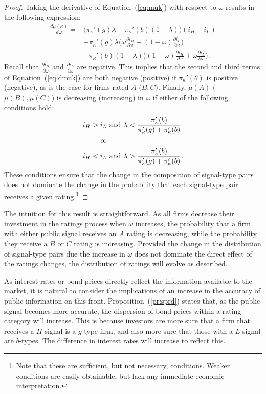 \documentclass[notitlepage]{article}
\begin{document}
\begin{proof}
Taking the derivative of Equation~(\ref{eq:muk}) with respect to $\omega$ results in the following expression:
\begin{align}
\label{eq:dmuk}
\frac{d\mu(\kappa)}{d\omega}=&\bigg(\pi_{\kappa}'(g)\lambda-\pi_{\kappa}'(b)(1-\lambda)\bigg)(i_{H}-i_{L})\nonumber\\
&+\pi_{\kappa}'(g)\lambda\bigg(\omega\frac{\partial i_{H}}{\partial \omega}+(1-\omega)\frac{\partial i_{L}}{\partial \omega}\bigg)\nonumber\\
&+\pi_{\kappa}'(b)(1-\lambda)\bigg((1-\omega)\frac{\partial i_{H}}{\partial \omega}+\omega\frac{\partial i_{L}}{\partial \omega}\bigg).
\end{align}
Recall that $\frac{\partial i_{H}}{\partial \omega}$ and $\frac{\partial i_{L}}{\partial \omega}$ are negative. This implies that the second and third terms of Equation~(\ref{eq:dmuk}) are both negative (positive) if $\pi_{\kappa}'(\theta)$ is positive (negative), as is the case for firms rated $A$ ($B,C$). Finally, $\mu(A)$ ($\mu(B),\mu(C)$) is decreasing (increasing) in $\omega$ if either of the following conditions hold:
\begin{align*}
i_{H}>i_{L} & \textup{ and }\lambda<\frac{\pi_{\kappa}'(b)}{\pi_{\kappa}'(g)+\pi_{\kappa}'(b)}\\
\textup{or} & \\
i_{H}<i_{L} & \textup{ and }\lambda>\frac{\pi_{\kappa}'(b)}{\pi_{\kappa}'(g)+\pi_{\kappa}'(b)}.
\end{align*}
These conditions ensure that the change in the composition of signal-type pairs does not dominate the change in the probability that each signal-type pair receives a given rating.\footnote{Note that these are sufficient, but not necessary, conditions. Weaker conditions are easily obtainable, but lack any immediate economic interpretation.}
\end{proof}

The intuition for this result is straightforward. As all firms decrease their investment in the ratings process when $\omega$ increases, the probability that a firm with either public signal receives an $A$ rating is decreasing, while the probability they receive a $B$ or $C$ rating is increasing. Provided the change in the distribution of signal-type pairs due the increase in $\omega$ does not dominate the direct effect of the ratings changes, the distribution of ratings will evolve as described. 

As interest rates or bond prices directly reflect the information available to the market, it is natural to consider the implications of an increase in the accuracy of public information on this front. Proposition~(\ref{pr:sprd}) states that, as the public signal becomes more accurate, the dispersion of bond prices within a rating category will increase. This is because investors are more sure that a firm that receives a $H$ signal is a $g$-type firm, and also more sure that those with a $L$ signal are $b$-types. The difference in interest rates will increase to reflect this.
\end{document}
